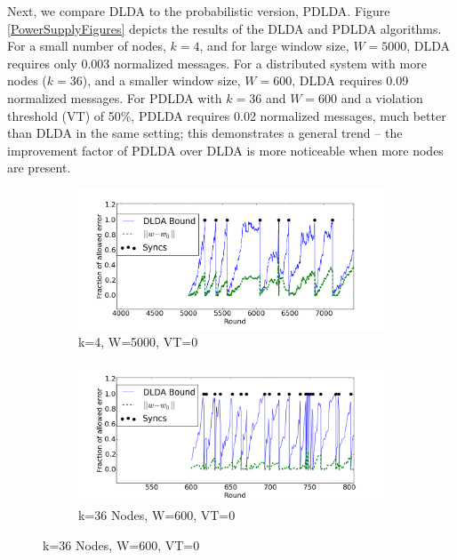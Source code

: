Next, we compare DLDA to the probabilistic version, PDLDA. 
Figure \ref{PowerSupplyFigures} depicts the results of the DLDA
and PDLDA algorithms. For a small number of nodes, $k=4$, and for large
window size, $W=5000$, DLDA requires only 0.003 normalized messages.
For a distributed system with more nodes ($k=36$), and a smaller window
size, $W=600$, DLDA requires 0.09 normalized messages. For PDLDA with
$k=36$ and $W=600$ and a violation threshold (VT) of 50\%, PDLDA
requires 0.02 normalized messages, much better than DLDA in the same setting;
this demonstrates a general trend -- the improvement factor of PDLDA
over DLDA is more noticeable when more nodes are present.


\begin{figure}
    \centering
    \begin{subfigure}[b]{0.5\textwidth}
        \includegraphics[width=\textwidth]{graphics/4nodes.png}
        \caption{k=4, W=5000, VT=0}
    \end{subfigure}

    \begin{subfigure}[b]{0.5\textwidth}
        \includegraphics[width=\textwidth]{graphics/36nodes.png}
        \caption{k=36 Nodes, W=600, VT=0}
    \end{subfigure}


\end{figure}
